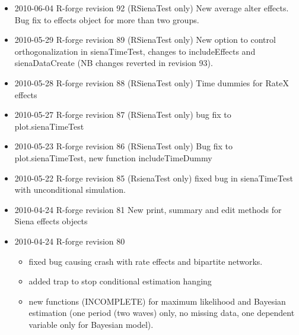 \documentclass[a4paper,fleqn,11pt]{article}
\newcommand{\+}{\, + \,}
\newcommand{\sfn}[1]{\textsf{#1}}
\begin{document}
\begin{small}
\begin{itemize}
\begin{itemize}
  (not in package: in the examples directory).
\item Progress on maximum likelihood code.
\item Bug fixes: print empty effects object, misaligned print.sienaFits, crash
  in \textsf{print.sienaEffects} with included interactions.
\item silent parameter now supresses more.
\item Added time dummy field to \sfn{setEffects} and removed from
\sfn{includeEffects}.
\item \sfn{includeInteractions} now will unInclude too.
\item \sfn{includeTimeDummy} now sets or unsets the include flag, and prints the
  changed lines.
\item Using composition change with bipartite networks will give an error
  message -- until this is corrected.
\item Separate help files for sienaTimeTest, plot.sienaTimeTest,
  includeTimeDummy.
\item Bug fix to treatment of missing data in sparse format bipartite networks.
\item Change to error message if an epoch is unlikely to terminate.
\end{itemize}
\item 2010-06-04 R-forge revision 92 (RSienaTest only) New average alter
  effects. Bug fix to effects object for more than two groups.
\item 2010-05-29 R-forge revision 89 (RSienaTest only)
New option to control orthogonalization in sienaTimeTest, changes to
includeEffects and sienaDataCreate (NB changes reverted in revision 93).
\item 2010-05-28 R-forge revision 88 (RSienaTest only)
Time dummies for RateX effects
\item 2010-05-27 R-forge revision 87 (RSienaTest only)
bug fix to plot.sienaTimeTest
\item 2010-05-23 R-forge revision 86 (RSienaTest only)
Bug fix to plot.sienaTimeTest, new function \textsf{includeTimeDummy}
\item 2010-05-22 R-forge revision 85 (RsienaTest only) fixed bug in
  \textsf{sienaTimeTest} with unconditional simulation.
\item 2010-04-24 R-forge revision 81
New print, summary and edit methods for Siena effects objects
\item 2010-04-24 R-forge revision 80
\begin{itemize}
\item fixed bug causing crash with rate effects and bipartite networks.
\item added trap to stop conditional estimation hanging
\item new functions (INCOMPLETE) for maximum likelihood and Bayesian estimation
  (one period (two waves) only, no missing data, one dependent variable only for
  Bayesian model).
\end{itemize}


\end{itemize}
\end{small}
\end{document}

